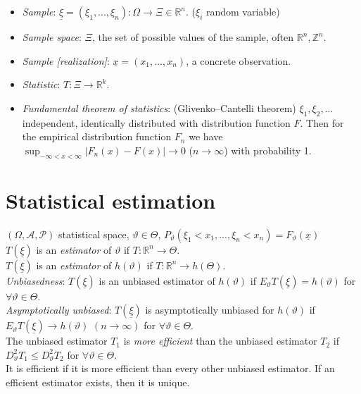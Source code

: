 \documentclass[margin=0px]{article}
\begin{document}
\begin{itemize}
    \item \textit{Sample}: $\underline{\xi} = (\xi_1,...,\xi_n): \Omega \to \Xi \in \mathbb{R}^n$. ($\xi_i$ random variable)
    \item \textit{Sample space}: $\Xi$, the set of possible values of the sample, often $\mathbb{R}^n, \mathbb{Z}^n$.
    \item \textit{Sample [realization]}: $\underline{x} = (x_1,...,x_n)$, a concrete observation.
    \item \textit{Statistic}: $T: \Xi \to \mathbb{R}^k$.
    \item \textit{Fundamental theorem of statistics}: (Glivenko--Cantelli theorem) $\xi_1, \xi_2, ...$ independent, identically distributed with distribution function $F$. Then for the empirical distribution function $F_n$ we have $\sup_{-\infty<x<\infty}{|F_n(x) - F(x)|} \to 0$ ($n \to \infty$) with probability 1.
\end{itemize}

\section{Statistical estimation}

$(\Omega, \mathcal{A}, \mathcal{P})$ statistical space, $\vartheta \in \Theta$, $P_{\vartheta}(\xi_1<x_1,...,\xi_n<x_n) = F_{\vartheta}(\underline{x})$ \\
$T(\underline{\xi})$ is an \textit{estimator} of $\vartheta$ if $T: \mathbb{R}^n \to \Theta$. \\
$T(\underline{\xi})$ is an \textit{estimator} of $h(\vartheta)$ if $T: \mathbb{R}^n \to h(\Theta)$. \\
\textit{Unbiasedness}: $T(\underline{\xi})$ is an unbiased estimator of $h(\vartheta)$ if $E_{\vartheta}T(\underline{\xi}) = h(\vartheta)$ for $\forall \vartheta \in \Theta$. \\
\textit{Asymptotically unbiased}: $T(\underline{\xi})$ is asymptotically unbiased for $h(\vartheta)$ if $E_{\vartheta}T(\underline{\xi}) \to h(\vartheta)$ $(n \to \infty)$ for $\forall \vartheta \in \Theta$. \\
The unbiased estimator $T_1$ is \textit{more efficient} than the unbiased estimator $T_2$ if $D_{\vartheta}^{2}T_1 \leq D_{\vartheta}^{2}T_2$ for $\forall \vartheta \in \Theta$. \\
It is efficient if it is more efficient than every other unbiased estimator. If an efficient estimator exists, then it is unique.
\end{document}

